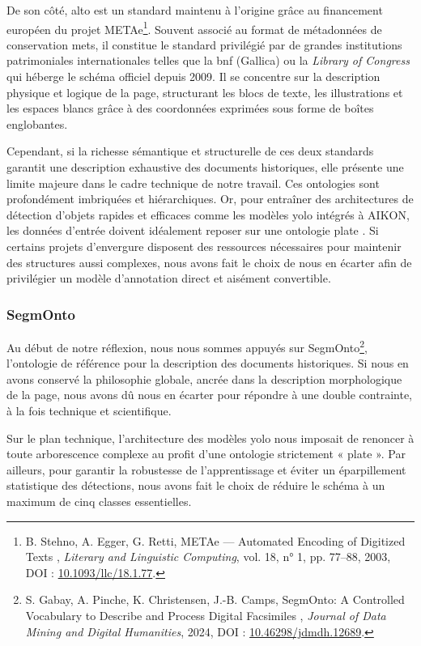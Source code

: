 De son côté, \gls{alto} est un standard maintenu à l'origine grâce au financement européen du projet METAe\footnote{B. Stehno, A. Egger, G. Retti, \og METAe --- Automated Encoding of Digitized Texts \fg, \textit{Literary and Linguistic Computing}, vol. 18, n° 1, pp. 77–88, 2003, DOI : \href{https://doi.org/10.1093/llc/18.1.77}{10.1093/llc/18.1.77}.}. Souvent associé au format de métadonnées de conservation \gls{mets}, il constitue le standard privilégié par de grandes institutions patrimoniales internationales telles que la \gls{bnf} (Gallica) ou la \textit{Library of Congress} qui héberge le schéma officiel depuis 2009. Il se concentre sur la description physique et logique de la page, structurant les blocs de texte, les illustrations et les espaces blancs grâce à des coordonnées exprimées sous forme de boîtes englobantes.

Cependant, si la richesse sémantique et structurelle de ces deux standards garantit une description exhaustive des documents historiques, elle présente une limite majeure dans le cadre technique de notre travail. Ces ontologies sont profondément imbriquées et hiérarchiques. Or, pour entraîner des architectures de détection d'objets rapides et efficaces comme les modèles \gls{yolo} intégrés à AIKON, les données d'entrée doivent idéalement reposer sur une ontologie \og plate \fg. Si certains projets d'envergure disposent des ressources nécessaires pour maintenir des structures aussi complexes, nous avons fait le choix de nous en écarter afin de privilégier un modèle d'annotation direct et aisément convertible.


\subsubsection{SegmOnto}

Au début de notre réflexion, nous nous sommes appuyés sur SegmOnto\footnote{S. Gabay, A. Pinche, K. Christensen, J.-B. Camps, \og SegmOnto: A Controlled Vocabulary to Describe and Process Digital Facsimiles \fg, \textit{Journal of Data Mining and Digital Humanities}, 2024, DOI : \href{https://doi.org/10.46298/jdmdh.12689}{10.46298/jdmdh.12689}.}, l'ontologie de référence pour la description des documents historiques. Si nous en avons conservé la philosophie globale, ancrée dans la description morphologique de la page, nous avons dû nous en écarter pour répondre à une double contrainte, à la fois technique et scientifique.

Sur le plan technique, l'architecture des modèles \gls{yolo} nous imposait de renoncer à toute arborescence complexe au profit d'une ontologie strictement « plate ». Par ailleurs, pour garantir la robustesse de l'apprentissage et éviter un éparpillement statistique des détections, nous avons fait le choix de réduire le schéma à un maximum de cinq classes essentielles.

